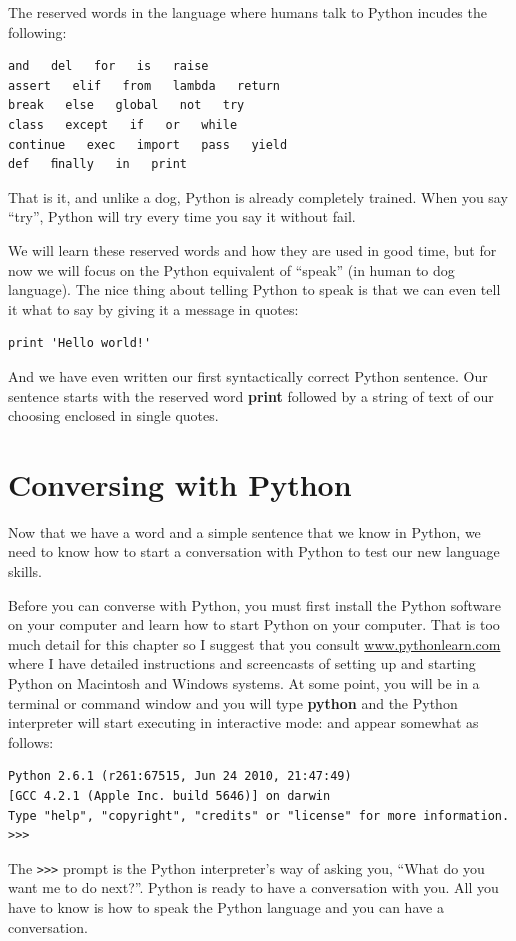 \documentclass[11pt]{book}
\begin{document}
The reserved words in the language where humans talk to 
Python incudes the following:

\beforeverb
\begin{verbatim}
and   del   for   is   raise 
assert   elif   from   lambda   return 
break   else   global   not   try 
class   except   if   or   while 
continue   exec   import   pass   yield 
def   ﬁnally   in   print 
\end{verbatim}
\afterverb
%
That is it, and unlike a dog, Python is already completely trained.
When you say ``try'', Python will try every time you say it without
fail.

We will learn these reserved words and how they are used in good time,
but for now we will focus on the Python equivalent of ``speak'' (in 
human to dog language).  The nice thing about telling Python to speak
is that we can even tell it what to say by giving it a message in quotes:

\beforeverb
\begin{verbatim}
print 'Hello world!'
\end{verbatim}
\afterverb

And we have even written our first syntactically correct Python sentence.
Our sentence starts with the reserved word {\bf print} followed
by a string of text of our choosing enclosed in single quotes.

\section{Conversing with Python}

Now that we have a word and a simple sentence that we know in Python,
we need to know how to start a conversation with Python to test 
our new language skills.

Before you can converse with Python, you must first install the Python
software on your computer and learn how to start Python on your 
computer.  That is too much detail for this chapter so I suggest
that you consult \url{www.pythonlearn.com} where I have detailed
instructions and screencasts of setting up and starting Python 
on Macintosh and Windows systems.  At some point, you will be in 
a terminal or command window and you will type {\bf python} and 
the Python interpreter will start executing in interactive mode:
and appear somewhat as follows:

\beforeverb
\begin{verbatim}
Python 2.6.1 (r261:67515, Jun 24 2010, 21:47:49) 
[GCC 4.2.1 (Apple Inc. build 5646)] on darwin
Type "help", "copyright", "credits" or "license" for more information.
>>> 
\end{verbatim}
\afterverb
%
The {\tt >>>} prompt is the Python interpreter's way of asking you, ``What
do you want me to do next?''.  Python is ready to have a conversation with
you.  All you have to know is how to speak the Python language and you 
can have a conversation.
\end{document}
